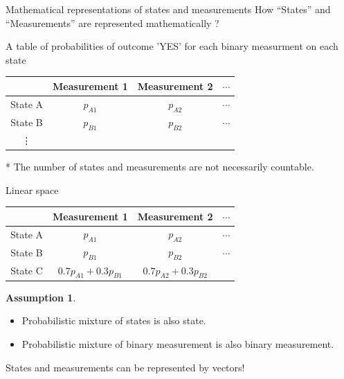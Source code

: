 \documentclass{beamer}
\newcommand\emm[1]{\textcolor{redorange}{{#1}}}
\theoremstyle{definition}
\newtheorem{assumption}{Assumption}
\begin{document}
\begin{frame}{Mathematical representations of states and measurements}
How ``States'' and ``Measurements'' are represented mathematically ?

\vspace{2em}
\centering
A table of probabilities of outcome 'YES' for each binary measurment on each state

\vspace{1em}
\begin{tabular}{|c||c|c|c|}
\hline
& Measurement 1 & Measurement 2 & $\cdots$\\
\hline
\hline
State A& $p_{A1}$ & $p_{A2}$ & $\cdots$\\
State B& $p_{B1}$ & $p_{B2}$ & $\cdots$\\
\vdots& &&\\
\hline
\end{tabular}

\vspace{2em}
* The number of states and measurements are not necessarily countable.

%
\end{frame}

\begin{frame}{Linear space}
\begin{tabular}{|c||c|c|c|}
\hline
& Measurement 1 & Measurement 2 & $\cdots$\\
\hline
\hline
State A& $p_{A1}$ & $p_{A2}$ & $\cdots$\\
State B& $p_{B1}$ & $p_{B2}$ & $\cdots$\\
State C& $0.7p_{A1} + 0.3 p_{B1}$ & $0.7p_{A2} + 0.3 p_{B2}$&\\
\hline
\end{tabular}

\vspace{1em}
\begin{assumption}
\begin{itemize}
\item \emm{Probabilistic mixture} of states is also state.
\item \emm{Probabilistic mixture} of binary measurement is also binary measurement.
\end{itemize}
\end{assumption}

\vspace{1em}
\centering
States and measurements can be represented by vectors!

\end{frame}
\end{document}
